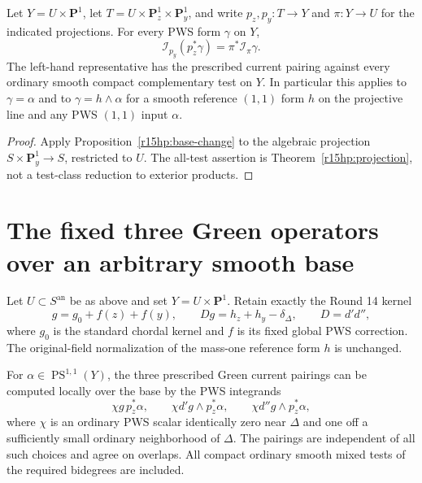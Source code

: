 \begin{corollary}
\label{r15hp:product-comparison}
Let $Y=U\times\mathbf P^1$, let
$T=U\times\mathbf P^1_z\times\mathbf P^1_y$, and write
$p_z,p_y:T\to Y$ and $\pi:Y\to U$ for the indicated
projections.  For every PWS form $\gamma$ on $Y$,
\[
                 \mathcal I_{p_y}(p_z^*\gamma)
                            =\pi^*\mathcal I_\pi\gamma.
\tag{HP15.14}\label{r15hp:product-M}
\]
The left-hand representative has the prescribed current pairing
against every ordinary smooth compact complementary test on $Y$.
In particular this applies to $\gamma=\alpha$ and to
$\gamma=h\wedge\alpha$ for a smooth reference $(1,1)$ form $h$
on the projective line and any PWS $(1,1)$ input $\alpha$.
\end{corollary}

\begin{proof}
Apply Proposition~\ref{r15hp:base-change} to the algebraic
projection $S\times\mathbf P^1_y\to S$, restricted to $U$.
The all-test assertion is Theorem~\ref{r15hp:projection}, not
a test-class reduction to exterior products.
\end{proof}

\section{The fixed three Green operators over an arbitrary smooth base}
\label{r15hp:green-section}

Let $U\subset S^{\mathrm{an}}$ be as above and set
$Y=U\times\mathbf P^1$.  Retain exactly the Round 14 kernel
\[
 g=g_0+f(z)+f(y),\qquad
             Dg=h_z+h_y-\delta_\Delta,
 \qquad D=d'd'',
\tag{HP15.15}\label{r15hp:fixed-kernel}
\]
where $g_0$ is the standard chordal kernel and $f$ is its fixed
global PWS correction.  The original-field normalization of the
mass-one reference form $h$ is unchanged.

\begin{lemma}
\label{r15hp:diagonal-excision}
For $\alpha\in\operatorname{PS}^{1,1}(Y)$, the three prescribed
Green current pairings can be computed locally over the base by
the PWS integrands
\[
 \chi g\,p_z^*\alpha,\qquad
 \chi d'g\wedge p_z^*\alpha,\qquad
 \chi d''g\wedge p_z^*\alpha,
\tag{HP15.16}\label{r15hp:cut-green-integrands}
\]
where $\chi$ is an ordinary PWS scalar identically zero near
$\Delta$ and one off a sufficiently small ordinary neighborhood
of $\Delta$.  The pairings are independent of all such choices
and agree on overlaps.  All compact ordinary smooth mixed tests
of the required bidegrees are included.
\end{lemma}

